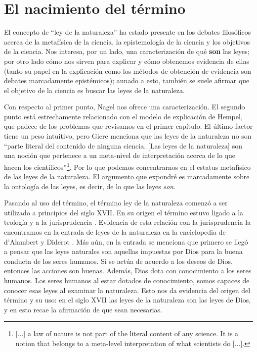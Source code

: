\section{El nacimiento del término}

\noindent El concepto de ``ley de la naturaleza'' ha estado presente en los debates filosóficos acerca de la metafísica de la ciencia, la epistemología de la ciencia y los objetivos de la ciencia. Nos interesa, por un lado, una caracterización de qué \textbf{son} las leyes; por otro lado cómo nos sirven para explicar y cómo obtenemos evidencia de ellas (tanto su papel en la explicación como los métodos de obtención de evidencia son debates marcadamente epistémicos); aunado a esto, también se suele afirmar que el objetivo de la ciencia es buscar las leyes de la naturaleza.

Con respecto al primer punto, Nagel nos ofrece una caracterización. El segundo punto está estrechamente relacionado con el modelo de explicación de Hempel, que padece de los problemas que revisamos en el primer capítulo. El último factor tiene un peso intuitivo, pero Giere \citeyear[p. 69]{Giere2006} menciona que las leyes de la naturaleza no son ``parte literal del contenido de ninguna ciencia. [Las leyes de la naturaleza] son una noción que pertenece a un meta-nivel de interpretación acerca de lo que hacen los científicos''\footnote{[...] a law of nature is not part of the literal content of any science. It is a notion that belongs to a meta-level interpretation of what scientists do [...].}. Por lo que podemos concentrarnos en el estatus metafísico de las leyes de la naturaleza. El argumento que expondré es marcadamente sobre la ontología de las leyes, es decir, de lo que las leyes \textit{son}.

Pasando al uso del término, el término ley de la naturaleza comenzó a ser utilizado a principios del siglo XVII. En su origen el término estuvo ligado a la teología y a la jurisprudencia \cite{Giere2006, Giere1999}. Evidencia de esta relación con la jurisprudencia la encontramos en la entrada de leyes de la naturaleza en la enciclopedia de d'Alambert y Diderot \cite{lawna}. Más aún, en la entrada se menciona que primero se llegó a pensar que las leyes naturales son aquellas impuestas por Dios para la buena conducta de los seres humanos. Si se actúa de acuerdo a los deseos de Dios, entonces las acciones son buenas. Además, Dios dota con conocimiento a los seres humanos. Los seres humanos al estar dotados de conocimiento, somos capaces de conocer esas leyes al examinar la naturaleza. Esto nos da evidencia del origen del término y su uso: en el siglo XVII las leyes de la naturaleza son las leyes de Dios, y en esto recae la afirmación de que sean necesarias.

